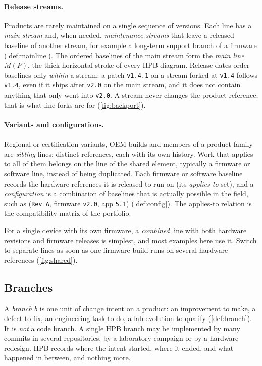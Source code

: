\paragraph{Release streams.}
Products are rarely maintained on a single sequence of versions. Each line
has a \emph{main stream} and, when needed, \emph{maintenance streams} that
leave a released baseline of another stream, for example a long-term
support branch of a firmware (\cref{def:mainline}). The ordered baselines
of the main stream form the \emph{main line} $M(P)$, the thick horizontal
stroke of every HPB diagram. Release dates order baselines only
\emph{within} a stream: a patch \texttt{v1.4.1} on a stream forked at
\texttt{v1.4} follows \texttt{v1.4}, even if it ships after \texttt{v2.0}
on the main stream, and it does not contain anything that only went into
\texttt{v2.0}. A stream never changes the product reference; that is what
line forks are for (\cref{fig:backport}).

\paragraph{Variants and configurations.}
Regional or certification variants, OEM builds and members of a product
family are \emph{sibling} lines: distinct references, each with its own
history. Work that applies to all of them belongs on the line of the shared
element, typically a firmware or software line, instead of being
duplicated. Each firmware or software baseline records the hardware
references it is released to run on (its \emph{applies-to} set), and a
\emph{configuration} is a combination of baselines that is actually
possible in the field, such as (\texttt{Rev~A}, firmware \texttt{v2.0},
app \texttt{5.1}) (\cref{def:config}). The applies-to relation is the
compatibility matrix of the portfolio.

For a single device with its own firmware, a \emph{combined} line with
both hardware revisions and firmware releases is simplest, and most
examples here use it. Switch to separate lines as soon as one firmware
build runs on several hardware references (\cref{fig:shared}).

\subsection{Branches}
\label{sec:model-branches}

A \emph{branch} $b$ is one unit of change intent on a product: an
improvement to make, a defect to fix, an engineering task to do, a lab
evolution to qualify (\cref{def:branch}). It is \emph{not} a code branch.
A single HPB branch may be implemented by many commits in several
repositories, by a laboratory campaign or by a hardware redesign. HPB
records where the intent started, where it ended, and what happened in
between, and nothing more.

